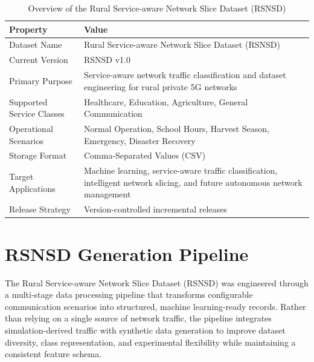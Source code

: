 \documentclass[12pt,a4paper]{report}
\begin{document}
\begin{table}[H]
	\centering
	\caption{Overview of the Rural Service-aware Network Slice Dataset (RSNSD)}
	\label{tab:rsnsd_overview}
	
	\begin{tabular}{|p{5cm}|p{10cm}|}
		\hline
		
		\textbf{Property} &
		\textbf{Value}
		\\
		\hline
		
		Dataset Name &
		Rural Service-aware Network Slice Dataset (RSNSD)
		\\
		\hline
		
		Current Version &
		RSNSD v1.0
		\\
		\hline
		
		Primary Purpose &
		Service-aware network traffic classification and dataset engineering for rural private 5G networks
		\\
		\hline
		
		Supported Service Classes &
		Healthcare, Education, Agriculture, General Communication
		\\
		\hline
		
		Operational Scenarios &
		Normal Operation, School Hours, Harvest Season, Emergency, Disaster Recovery
		\\
		\hline
		
		Storage Format &
		Comma-Separated Values (CSV)
		\\
		\hline
		
		Target Applications &
		Machine learning, service-aware traffic classification, intelligent network slicing, and future autonomous network management
		\\
		\hline
		
		Release Strategy &
		Version-controlled incremental releases
		\\
		\hline
		
	\end{tabular}
	
\end{table}

	
	\section{RSNSD Generation Pipeline}
	\label{sec:rsnsd_pipeline}
	
	The Rural Service-aware Network Slice Dataset (RSNSD) was engineered through a multi-stage data processing pipeline that transforms configurable communication scenarios into structured, machine learning-ready records. Rather than relying on a single source of network traffic, the pipeline integrates simulation-derived traffic with synthetic data generation to improve dataset diversity, class representation, and experimental flexibility while maintaining a consistent feature schema.
	
\end{document}
